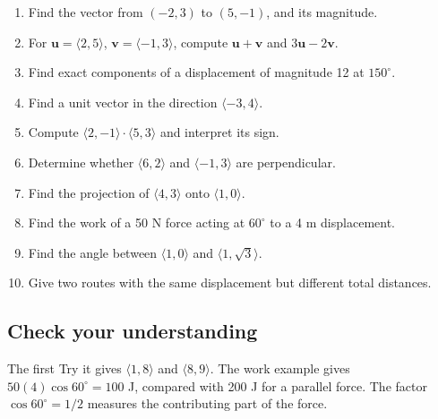 \begin{enumerate}
\def\labelenumi{\arabic{enumi}.}
\tightlist
\item
  Find the vector from \((-2,3)\) to \((5,-1)\), and its magnitude.
\item
  For \(\mathbf u=\langle2,5\rangle\), \(\mathbf v=\langle-1,3\rangle\), compute \(\mathbf u+\mathbf v\) and \(3\mathbf u-2\mathbf v\).
\item
  Find exact components of a displacement of magnitude 12 at \(150^\circ\).
\item
  Find a unit vector in the direction \(\langle-3,4\rangle\).
\item
  Compute \(\langle2,-1\rangle\cdot\langle5,3\rangle\) and interpret its sign.
\item
  Determine whether \(\langle6,2\rangle\) and \(\langle-1,3\rangle\) are perpendicular.
\item
  Find the projection of \(\langle4,3\rangle\) onto \(\langle1,0\rangle\).
\item
  Find the work of a 50 N force acting at \(60^\circ\) to a 4 m displacement.
\item
  Find the angle between \(\langle1,0\rangle\) and \(\langle1,\sqrt3\rangle\).
\item
  Give two routes with the same displacement but different total distances.
\end{enumerate}

\hypertarget{m6-check-your-understanding}{%
\subsection{Check your understanding}\label{m6-check-your-understanding}}

The first Try it gives \(\langle1,8\rangle\) and \(\langle8,9\rangle\). The work example gives \(50(4)\cos60^\circ=100\) J, compared with 200 J for a parallel force. The factor \(\cos60^\circ=1/2\) measures the contributing part of the force.

\clearpage
